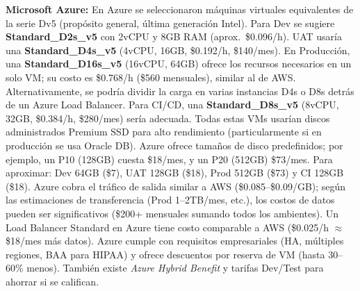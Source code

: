 \documentclass[12pt]{article}
\begin{document}
\textbf{Microsoft Azure:} En Azure se seleccionaron máquinas virtuales equivalentes de la serie Dv5 (propósito general, última generación Intel). Para Dev se sugiere \textbf{Standard\_D2s\_v5} con 2vCPU y 8GB RAM (aprox.\ \$0.096/h). UAT usaría una \textbf{Standard\_D4s\_v5} (4vCPU, 16GB, \$0.192/h, \$140/mes). En Producción, una \textbf{Standard\_D16s\_v5} (16vCPU, 64GB) ofrece los recursos necesarios en un solo VM; su costo es \$0.768/h (\$560 mensuales), similar al de AWS. Alternativamente, se podría dividir la carga en varias instancias D4s o D8s detrás de un Azure Load Balancer. Para CI/CD, una \textbf{Standard\_D8s\_v5} (8vCPU, 32GB, \$0.384/h, \$280/mes) sería adecuada. Todas estas VMs usarían discos administrados Premium SSD para alto rendimiento (particularmente si en producción se usa Oracle DB). Azure ofrece tamaños de disco predefinidos; por ejemplo, un P10 (128GB) cuesta \$18/mes, y un P20 (512GB) \$73/mes. Para aproximar: Dev 64GB (\$7), UAT 128GB (\$18), Prod 512GB (\$73) y CI 128GB (\$18). Azure cobra el tráfico de salida similar a AWS (\$0.085--\$0.09/GB); según las estimaciones de transferencia (Prod 1--2TB/mes, etc.), los costos de datos pueden ser significativos (\$200+ mensuales sumando todos los ambientes). Un Load Balancer Standard en Azure tiene costo comparable a AWS (\$0.025/h \(\approx\)\$18/mes más datos). Azure cumple con requisitos empresariales (HA, múltiples regiones, BAA para HIPAA) y ofrece descuentos por reserva de VM (hasta 30--60\% menos). También existe \emph{Azure Hybrid Benefit} y tarifas Dev/Test para ahorrar si se califican.
\end{document}
